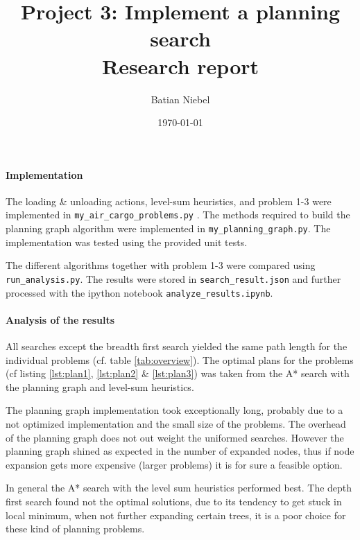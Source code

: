 \documentclass{article}
\begin{document}
\title{Project 3: Implement a planning search  \\ Research report}
\author{Batian Niebel}
\date{\today}
\maketitle

\paragraph*{Implementation}
The loading \& unloading actions, level-sum heuristics, and problem 1-3 were
implemented in \texttt{my\_air\_cargo\_problems.py} . The methods required to
build the planning graph algorithm were implemented in
\texttt{my\_planning\_graph.py}. The implementation was tested using the
provided unit tests.

The different algorithms together with problem 1-3 were compared using
\texttt{run\_analysis.py}. The results were stored in
\texttt{search\_result.json} and further processed with the ipython notebook
\texttt{analyze\_results.ipynb}.

\paragraph*{Analysis of the results}
All searches except the breadth first search yielded the same path length for
the individual problems (cf. table \ref{tab:overview}). The optimal plans for
the problems (cf listing \ref{lst:plan1}, \ref{lst:plan2} \& \ref{lst:plan3}) was taken from
the A* search with the planning graph and level-sum heuristics.

The planning graph implementation took exceptionally long, probably due to a not
optimized implementation and the small size of the problems. The overhead of the
planning graph does not out weight the uniformed searches. However the planning
graph shined as expected in the number of expanded nodes, thus if node
expansion gets more expensive (larger problems) it is for sure a feasible
option.

In general the A* search with the level sum heuristics performed best. The depth first search
found not the optimal solutions, due to its tendency to get stuck in local
minimum, when not further expanding certain trees, it is a poor choice for these
kind of planning problems.
\end{document}
